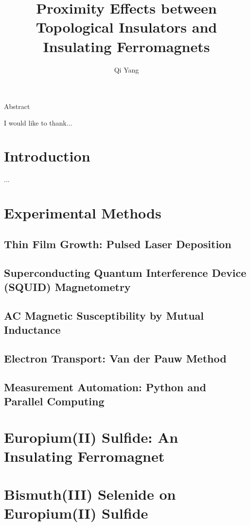 \documentclass{report}
\begin{document}
\title{Proximity Effects between Topological Insulators and Insulating Ferromagnets}
\author{Qi Yang}

\beforepreface


    Abstract 


    I would like to thank...
\afterpreface

\captionsetup{width=0.95\columnwidth}%
\chapter{Introduction}
    ...
	
    
\chapter{Experimental Methods}
    \section{Thin Film Growth: Pulsed Laser Deposition}\label{sec:pld}
		
    \section{Superconducting Quantum Interference Device (SQUID) Magnetometry}
    \section{AC Magnetic Susceptibility by Mutual Inductance}
    \section{Electron Transport: Van der Pauw Method}
    \section{Measurement Automation: Python and Parallel Computing}

\chapter{Europium(II) Sulfide: An Insulating Ferromagnet}
\label{ch:EuS}

\chapter{Bismuth(III) Selenide on Europium(II) Sulfide}
\label{ch:bilayer2014}
\end{document}
